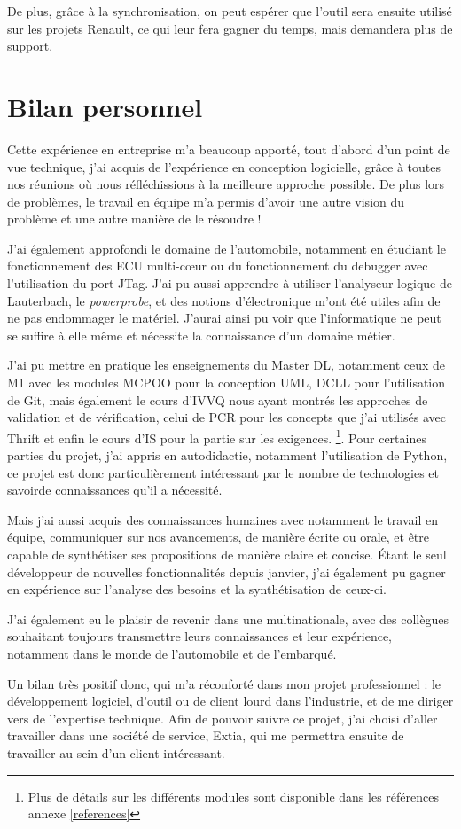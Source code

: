 De plus, grâce à la synchronisation, on peut espérer que l'outil sera ensuite utilisé sur les projets Renault, ce qui leur fera gagner du temps, mais demandera plus de support.

%
\section{Bilan personnel}
Cette expérience en entreprise m'a beaucoup apporté, tout d'abord d'un point de vue technique, j'ai acquis de l'expérience en conception logicielle, grâce
à toutes nos réunions où nous réfléchissions à la meilleure approche possible. De plus lors de problèmes, le travail en équipe m'a permis d'avoir
une autre vision du problème et une autre manière de le résoudre !

J'ai également approfondi le domaine de l'automobile, notamment en étudiant le fonctionnement des ECU multi-cœur ou du fonctionnement du debugger avec l'utilisation du port JTag. J'ai pu aussi apprendre à utiliser l'analyseur logique de Lauterbach, le \textit{powerprobe}, et des notions d'électronique m'ont été utiles afin de ne pas endommager le matériel. J'aurai ainsi pu voir que l'informatique ne peut se suffire à elle même et nécessite la connaissance d'un domaine métier.

J'ai pu mettre en pratique les enseignements du Master DL, notamment ceux de M1 avec les modules MCPOO pour la conception UML, DCLL pour l'utilisation de Git, mais également le cours d'IVVQ nous ayant montrés les approches de validation et de vérification, celui de PCR pour les concepts que j'ai utilisés avec Thrift et enfin le cours d'IS pour la partie sur les exigences. \footnote{Plus de détails sur les différents modules sont disponible dans les références annexe \ref{references}}. Pour certaines parties du projet, j'ai appris en autodidactie, notamment l'utilisation de Python, ce projet est donc particulièrement intéressant par le nombre de technologies et savoirde connaissances qu'il a nécessité.

%
Mais j'ai aussi acquis des connaissances humaines avec notamment le travail en équipe, communiquer sur nos avancements, de manière écrite ou orale, et être capable de synthétiser ses propositions de manière claire et concise. Étant le seul développeur de nouvelles fonctionnalités depuis janvier, j'ai également pu gagner en expérience sur l'analyse des besoins et la synthétisation de ceux-ci.

J'ai également eu le plaisir de revenir dans une multinationale, avec des collègues souhaitant toujours transmettre leurs connaissances et leur expérience, notamment dans le monde de l'automobile et de l'embarqué. 

Un bilan très positif donc, qui m'a réconforté dans mon projet professionnel : le développement logiciel, d'outil ou de client lourd dans l'industrie, et de me diriger vers de l'expertise technique. Afin de pouvoir suivre ce projet, j'ai choisi d'aller travailler dans une société de service, Extia, qui me permettra ensuite de travailler au sein d'un client intéressant.

